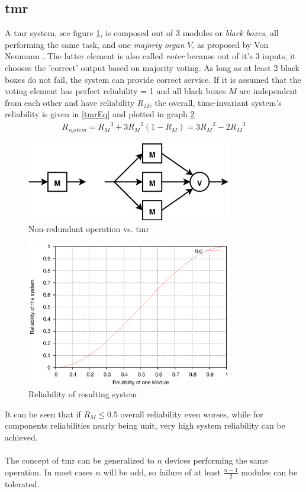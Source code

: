 \subsection{\gls{tmr}}
A \gls{tmr} system, see figure \ref{fig:tmr}, is composed out of 3 modules or \textit{black boxes}, all performing the same task,	
and one \textit{majoriy organ} $V$, as proposed by Von Neumann \cite{vN56}. The latter element
is also called \textit{voter} because out of it's 3 inputs, it chooses the 'correct' output based on majority voting. As long as at least 2 black boxes do not
fail, the system can provide correct service. If it is assumed that the voting element has perfect reliability = 1 and all black boxes $M$ are independent from
each other and have reliability $R_M$, the overall, time-invariant system's reliability is given in \ref{tmrEq} \cite{Lyons:1962:UTR:1661979.1661984} and plotted in graph \ref{fig:tmrGrp}
\begin{align}\label{tmrEq}
 R_{system} = {R_M}^3 + 3{R_M}^2(1-R_M) = 3{R_M}^2 - 2{R_M}^3
\end{align}
\begin{figure}
    \centering
    \includegraphics[width=0.8\textwidth]{figures/tmr.eps}
    \caption{Non-redundant operation vs. \gls{tmr}}
    \label{fig:tmr}
\end{figure}
\begin{figure}
    \centering
    \includegraphics[width=0.8\textwidth]{figures/tmrGraph.eps}
    \caption{Reliability of resulting system}
    \label{fig:tmrGrp}
\end{figure}
It can be seen that if $R_M \leq 0.5$ overall reliability even worses, while for components reliabilities nearly being unit, very high system reliability can
be achieved.
\\
\\
The concept of \gls{tmr} can be generalized to $n$ devices performing
the same operation. In most cases $n$ will be odd, so failure of at least $\frac{n-1}{2}$ modules can be tolerated.

